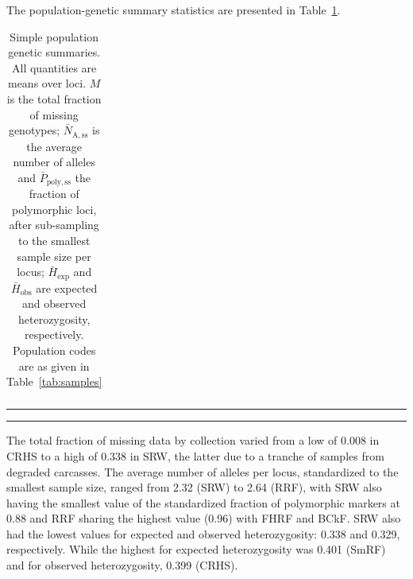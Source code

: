 The population-genetic summary statistics are presented in Table~\ref{tab:pg-summ}.
\begin{table}
\caption{\footnotesize Simple population genetic summaries. All quantities are means
over loci.   $M$ is the total fraction of missing genotypes; $\bar{N}_\mathrm{A,ss}$ is the
average number of alleles and $\bar{P}_\mathrm{poly,ss}$ the fraction of polymorphic loci,
after sub-sampling to the smallest sample size per locus; $\bar{H}_\mathrm{exp}$ and
$\bar{H}_\mathrm{obs}$ are expected and observed heterozygosity, respectively. Population
codes are as given in Table~\ref{tab:samples}}
\label{tab:pg-summ}
{\footnotesize
\begin{tabular*}{0.48\textwidth}{@{\extracolsep{\fill}} lrrrrr}
\hline\hline

\end{tabular*}
}
\par\vspace*{-2.2ex}\noindent\rule{0.48\textwidth}{0.5pt}
\par\vspace*{-2.4ex}\noindent\rule{0.48\textwidth}{0.5pt}
\end{table}
The total fraction of missing data by collection varied from a low of
0.008  in CRHS to a high of 0.338 in SRW, the latter due to a tranche of
samples from degraded carcasses. The average number of alleles
per locus, standardized to the smallest sample size, ranged from 2.32 (SRW) to
2.64 (RRF), with  SRW also having the smallest value of the
standardized fraction of polymorphic markers at 0.88 and RRF sharing the highest value
(0.96) with FHRF and BCkF.
SRW also had the lowest values for expected and observed heterozygosity:
0.338 and 0.329, respectively. While the highest for expected heterozygosity
was 0.401 (SmRF) and for observed heterozygosity, 0.399 (CRHS).

